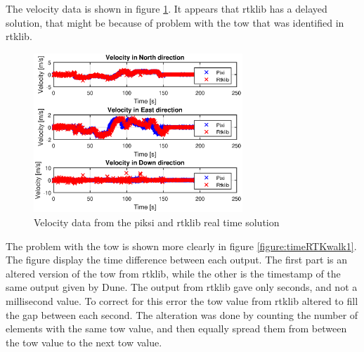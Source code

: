 The velocity data is shown in figure \ref{figure:VelocityWalk1}. It appears that rtklib has a delayed solution, that might be because of problem with the \gls{tow} that was identified in rtklib.
\begin{figure}[H]
	\centering
		\includegraphics[width=0.7\textwidth]{figs/plots/velocity.eps}
		\caption{Velocity data from the piksi and rtklib real time solution}
		\label{figure:VelocityWalk1}
\end{figure}
The problem with the \gls{tow} is shown more clearly in figure \ref{figure:timeRTKwalk1}. The figure display the time difference between each output. The first part is an altered version of the \gls{tow} from rtklib, while the other is the timestamp of the same output given by Dune. The output from rtklib gave only seconds, and not a millisecond value. To correct for this error the \gls{tow} value from rtklib altered to fill the gap between each second. The alteration was done by counting the number of elements with the same \gls{tow} value, and then equally spread them from between the \gls{tow} value to the next \gls{tow} value.

